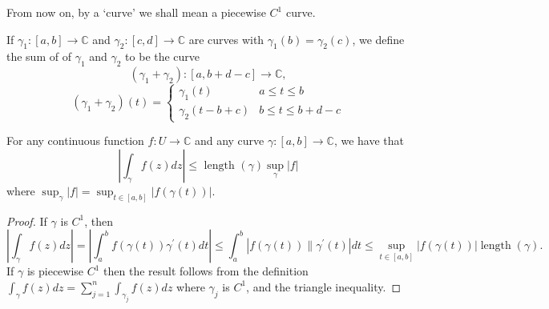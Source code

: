 \documentclass[egregdoesnotlikesansseriftitles,a4paper]{scrartcl}
\begin{document}
\begin{remark}
      From now on, by a `curve' we shall mean a piecewise $C^{1}$ curve.
\end{remark}
\begin{definition*}
     If $\gamma_{1}:[a, b] \rightarrow \mathbb{C}$ and $\gamma_{2}:[c, d] \rightarrow \mathbb{C}$ are curves with $\gamma_{1}(b)=\gamma_{2}(c)$, we define the sum of of $\gamma_{1}$ and $\gamma_{2}$ to be the curve \[
          \left(\gamma_{1}+\gamma_{2}\right): [a, b+d-c] \rightarrow \mathbb{C}
     ,\] 
     \begin{equation*}
          \left(\gamma_{1}+\gamma_{2}\right)(t)=
           \begin{cases}
               \gamma_{1}(t) & a \leq t \leq b \\
               \gamma_{2}(t-b+c) & b \leq t \leq b+d-c
          \end{cases}
     \end{equation*}
\end{definition*}
\begin{proposition}\label{basicestimate}
     For any continuous function $f: U \rightarrow \mathbb{C}$ and any curve $\gamma:[a, b] \rightarrow \mathbb{C}$, we have that
     $$
     \left|\int_{\gamma} f(z) d z\right| \leq \text { length }(\gamma) \sup _{\gamma}|f|
     $$
     where $\sup _{\gamma}|f|=\sup _{t \in[a, b]}|f(\gamma(t))|$.
\end{proposition}
\begin{proof}
     If $\gamma$ is $C^{1}$, then \[
          \left|\int_{\gamma} f(z) d z\right|=\left|\int_{a}^{b} f(\gamma(t)) \gamma^{\prime}(t) d t\right| \leq
          \int_{a}^{b}\left|f(\gamma(t)) \| \gamma^{\prime}(t)\right| d t \leq \sup _{t \in[a, b]}|f(\gamma(t))|\operatorname{length}(\gamma)
     .\] If $\gamma$ is piecewise $C^{1}$ then the result follows from the definition $\int_{\gamma} f(z) d z=\sum_{j=1}^{n} \int_{\gamma_{j}} f(z) d z$ where $\gamma_{j}$ is $C^{1}$, and the triangle inequality.
\end{proof}
\end{document}
